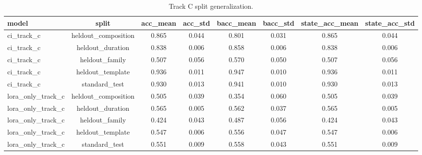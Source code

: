 \begin{table}[t]
\centering
\caption{Track C split generalization.}
\label{tab:track-c-splits}
\footnotesize
\begin{tabular}{lccccccc}
\toprule
model & split & acc_mean & acc_std & bacc_mean & bacc_std & state_acc_mean & state_acc_std \\
\midrule
ci_track_c & heldout_composition & 0.865 & 0.044 & 0.801 & 0.031 & 0.865 & 0.044 \\
ci_track_c & heldout_duration & 0.838 & 0.006 & 0.858 & 0.006 & 0.838 & 0.006 \\
ci_track_c & heldout_family & 0.507 & 0.056 & 0.570 & 0.050 & 0.507 & 0.056 \\
ci_track_c & heldout_template & 0.936 & 0.011 & 0.947 & 0.010 & 0.936 & 0.011 \\
ci_track_c & standard_test & 0.930 & 0.013 & 0.941 & 0.010 & 0.930 & 0.013 \\
lora_only_track_c & heldout_composition & 0.505 & 0.039 & 0.354 & 0.060 & 0.505 & 0.039 \\
lora_only_track_c & heldout_duration & 0.565 & 0.005 & 0.562 & 0.037 & 0.565 & 0.005 \\
lora_only_track_c & heldout_family & 0.424 & 0.043 & 0.487 & 0.056 & 0.424 & 0.043 \\
lora_only_track_c & heldout_template & 0.547 & 0.006 & 0.556 & 0.047 & 0.547 & 0.006 \\
lora_only_track_c & standard_test & 0.551 & 0.009 & 0.558 & 0.043 & 0.551 & 0.009 \\
\bottomrule
\end{tabular}
\end{table}
